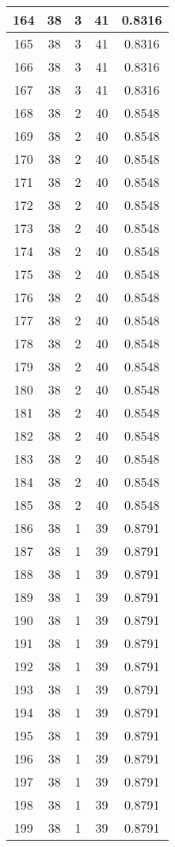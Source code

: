 \documentclass[letterpaper, 12pt]{article}
\begin{document}
\begin{longtable}{|c|c|c|c|c|}
\hline
164 & 38 & 3 & 41 & 0.8316 \\
\hline
165 & 38 & 3 & 41 & 0.8316 \\
\hline
166 & 38 & 3 & 41 & 0.8316 \\
\hline
167 & 38 & 3 & 41 & 0.8316 \\
\hline
168 & 38 & 2 & 40 & 0.8548 \\
\hline
169 & 38 & 2 & 40 & 0.8548 \\
\hline
170 & 38 & 2 & 40 & 0.8548 \\
\hline
171 & 38 & 2 & 40 & 0.8548 \\
\hline
172 & 38 & 2 & 40 & 0.8548 \\
\hline
173 & 38 & 2 & 40 & 0.8548 \\
\hline
174 & 38 & 2 & 40 & 0.8548 \\
\hline
175 & 38 & 2 & 40 & 0.8548 \\
\hline
176 & 38 & 2 & 40 & 0.8548 \\
\hline
177 & 38 & 2 & 40 & 0.8548 \\
\hline
178 & 38 & 2 & 40 & 0.8548 \\
\hline
179 & 38 & 2 & 40 & 0.8548 \\
\hline
180 & 38 & 2 & 40 & 0.8548 \\
\hline
181 & 38 & 2 & 40 & 0.8548 \\
\hline
182 & 38 & 2 & 40 & 0.8548 \\
\hline
183 & 38 & 2 & 40 & 0.8548 \\
\hline
184 & 38 & 2 & 40 & 0.8548 \\
\hline
185 & 38 & 2 & 40 & 0.8548 \\
\hline
186 & 38 & 1 & 39 & 0.8791 \\
\hline
187 & 38 & 1 & 39 & 0.8791 \\
\hline
188 & 38 & 1 & 39 & 0.8791 \\
\hline
189 & 38 & 1 & 39 & 0.8791 \\
\hline
190 & 38 & 1 & 39 & 0.8791 \\
\hline
191 & 38 & 1 & 39 & 0.8791 \\
\hline
192 & 38 & 1 & 39 & 0.8791 \\
\hline
193 & 38 & 1 & 39 & 0.8791 \\
\hline
194 & 38 & 1 & 39 & 0.8791 \\
\hline
195 & 38 & 1 & 39 & 0.8791 \\
\hline
196 & 38 & 1 & 39 & 0.8791 \\
\hline
197 & 38 & 1 & 39 & 0.8791 \\
\hline
198 & 38 & 1 & 39 & 0.8791 \\
\hline
199 & 38 & 1 & 39 & 0.8791 \\
\hline
\end{longtable}
\end{document}
